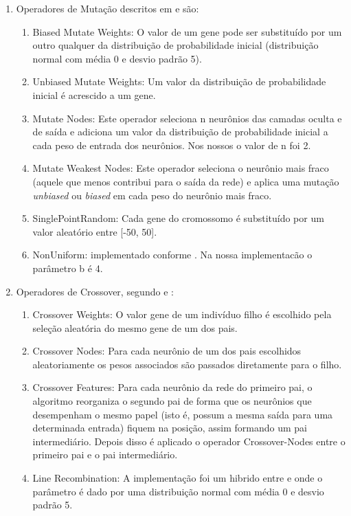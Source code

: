 \documentclass[12pt]{article}
\begin{document}
\begin{enumerate}
	\item Operadores de Mutação descritos em \cite{montana} e \cite{Liu} são:
	\begin{enumerate}
		\item Biased Mutate Weights: O valor de um gene pode ser substituído por um outro qualquer da distribuição de probabilidade inicial (distribuição normal com média 0 e desvio padrão 5).
		\item Unbiased Mutate Weights: Um valor da distribuição de probabilidade inicial é acrescido a um gene.
		\item Mutate Nodes: Este operador seleciona n neurônios das camadas oculta e de saída e adiciona um valor da distribuição de probabilidade inicial a cada peso de entrada dos neurônios. Nos nossos o valor de n foi 2.
		\item Mutate Weakest Nodes: Este operador seleciona o neurônio mais fraco (aquele que menos contribui para o saída da rede) e aplica uma mutação \textit{unbiased} ou \textit{biased} em cada peso do neurônio mais fraco.
		\item SinglePointRandom: Cada gene do cromossomo é substituído por um valor aleatório entre [-50, 50].
		\item NonUniform: implementado conforme \cite{Michalewicz}. Na nossa implementacão o parâmetro b é 4.
		
	\end{enumerate}

	\item Operadores de Crossover, segundo \cite{montana} e \cite{Liu}:
	\begin{enumerate}
		\item Crossover Weights: O valor gene de um indivíduo filho é escolhido pela seleção aleatória do mesmo gene de um dos pais.
		\item Crossover Nodes: Para cada neurônio de um dos pais escolhidos aleatoriamente os pesos associados são passados diretamente para o filho.
		\item Crossover Features: Para cada neurônio da rede do primeiro pai, o algoritmo reorganiza o segundo pai de forma que os neurônios que desempenham o mesmo papel (isto é, possum a mesma saída para uma determinada entrada) fiquem na posição, assim formando um pai intermediário. Depois disso é aplicado o operador Crossover-Nodes entre o primeiro pai e o pai intermediário.
		\item Line Recombination: A implementação foi um hibrido entre \cite{Liu} e \cite{essentials} onde o parâmetro é dado por uma distribuição normal com média 0 e desvio padrão 5.
	\end{enumerate}

\end{enumerate}
\end{document}
